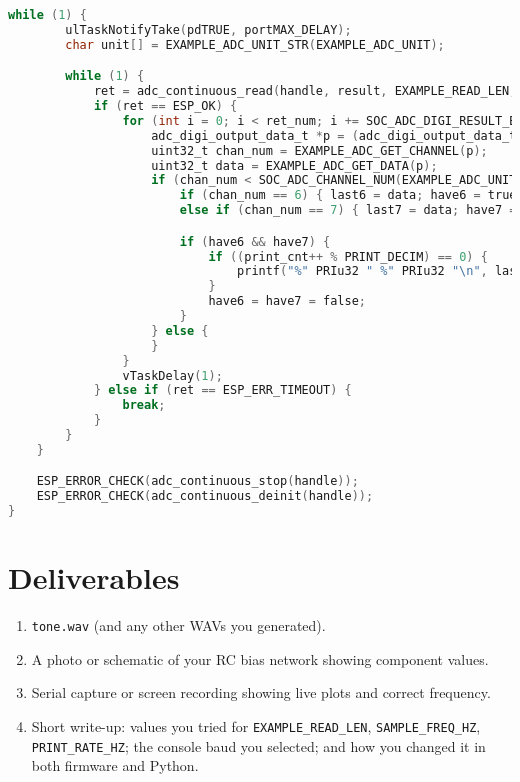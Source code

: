 \documentclass[11pt]{article}
\begin{document}
\begin{lstlisting}[language=C, caption={ESP32 Firmware (ADC continuous, two channels)}]
    while (1) {
        ulTaskNotifyTake(pdTRUE, portMAX_DELAY);
        char unit[] = EXAMPLE_ADC_UNIT_STR(EXAMPLE_ADC_UNIT);

        while (1) {
            ret = adc_continuous_read(handle, result, EXAMPLE_READ_LEN, &ret_num, 0);
            if (ret == ESP_OK) {
                for (int i = 0; i < ret_num; i += SOC_ADC_DIGI_RESULT_BYTES) {
                    adc_digi_output_data_t *p = (adc_digi_output_data_t*)&result[i];
                    uint32_t chan_num = EXAMPLE_ADC_GET_CHANNEL(p);
                    uint32_t data = EXAMPLE_ADC_GET_DATA(p);
                    if (chan_num < SOC_ADC_CHANNEL_NUM(EXAMPLE_ADC_UNIT)) {
                        if (chan_num == 6) { last6 = data; have6 = true; }
                        else if (chan_num == 7) { last7 = data; have7 = true; }

                        if (have6 && have7) {
                            if ((print_cnt++ % PRINT_DECIM) == 0) {
                                printf("%" PRIu32 " %" PRIu32 "\n", last6, last7);
                            }
                            have6 = have7 = false;
                        }
                    } else {
                    }
                }
                vTaskDelay(1);
            } else if (ret == ESP_ERR_TIMEOUT) {
                break;
            }
        }
    }

    ESP_ERROR_CHECK(adc_continuous_stop(handle));
    ESP_ERROR_CHECK(adc_continuous_deinit(handle));
}
\end{lstlisting}

\section*{Deliverables}
\begin{enumerate}[label=\arabic*.]
  \item \texttt{tone.wav} (and any other WAVs you generated).
  \item A photo or schematic of your RC bias network showing component values.
  \item Serial capture or screen recording showing live plots and correct frequency.
  \item Short write-up: values you tried for \texttt{EXAMPLE\_READ\_LEN}, \texttt{SAMPLE\_FREQ\_HZ}, \texttt{PRINT\_RATE\_HZ}; the console baud you selected; and how you changed it in both firmware and Python.
\end{enumerate}
\end{document}
